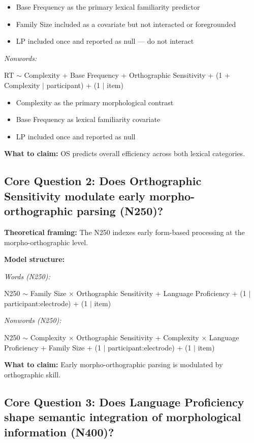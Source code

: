 \documentclass[12pt]{article}
\begin{document}
	\begin{itemize}[leftmargin=*]
		\item Base Frequency as the primary lexical familiarity predictor
		\item Family Size included as a covariate but not interacted or foregrounded
		\item LP included once and reported as null — do not interact
	\end{itemize}
	
	\textit{Nonwords:}
	
	RT $\sim$ Complexity + Base Frequency + Orthographic Sensitivity + (1 + Complexity $|$ participant) + (1 $|$ item)
	
	\begin{itemize}[leftmargin=*]
		\item Complexity as the primary morphological contrast
		\item Base Frequency as lexical familiarity covariate
		\item LP included once and reported as null
	\end{itemize}
	
	\textbf{What to claim:} OS predicts overall efficiency across both lexical categories.
	
	\subsection{Core Question 2: Does Orthographic Sensitivity modulate early morpho-orthographic parsing (N250)?}
	
	\textbf{Theoretical framing:} The N250 indexes early form-based processing at the morpho-orthographic level.
	
	\textbf{Model structure:}
	
	\textit{Words (N250):}
	
	N250 $\sim$ Family Size $\times$ Orthographic Sensitivity + Language Proficiency + (1 $|$ participant:electrode) + (1 $|$ item)
	
	\textit{Nonwords (N250):}
	
	N250 $\sim$ Complexity $\times$ Orthographic Sensitivity + Complexity $\times$ Language Proficiency + Family Size + (1 $|$ participant:electrode) + (1 $|$ item)
	
	\textbf{What to claim:} Early morpho-orthographic parsing is modulated by orthographic skill.
	
	\subsection{Core Question 3: Does Language Proficiency shape semantic integration of morphological information (N400)?}
	
\end{document}
